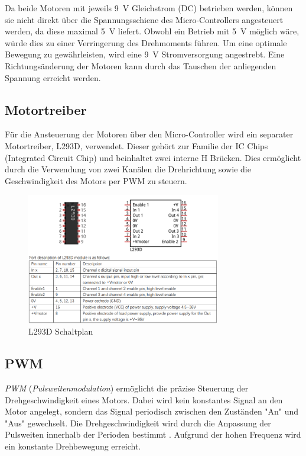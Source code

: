 \documentclass[conference,compsoc,final,a4paper]{IEEEtran}
\begin{document}
\noindent Da beide Motoren mit jeweils \qty{9}{V} Gleichstrom (DC) betrieben werden, können sie nicht direkt über die Spannungsschiene des Micro-Controllers angesteuert werden, 
da diese maximal \qty{5}{V} liefert. Obwohl ein Betrieb mit \qty{5}{V} möglich wäre, würde dies zu einer Verringerung des Drehmoments führen. Um eine optimale Bewegung zu gewährleisten, 
wird eine \qty{9}{V} Stromversorgung angestrebt. Eine Richtungsänderung der Motoren kann durch das Tauschen der anliegenden Spannung erreicht werden.  

\subsection{Motortreiber}

Für die Ansteuerung der Motoren über den Micro-Controller wird ein separater Motortreiber, L293D, verwendet.
Dieser gehört zur Familie der IC Chips (Integrated Circuit Chip) und beinhaltet zwei interne H Brücken. Dies ermöglicht durch die Verwendung von zwei Kanälen die Drehrichtung 
sowie die Geschwindigkeit des Motors per PWM  zu steuern.

\begin{figure}[h]
  \centering
\includegraphics[width=8.5cm]{../images/L293D.png}
\caption{L293D Schaltplan \autocite{freenoveTutorial}}\label{Elektrik:L293D}
\end{figure}

\subsection{PWM}
\emph{PWM} (\emph{Pulsweitenmodulation}) ermöglicht die präzise Steuerung der Drehgeschwindigkeit eines Motors. Dabei wird kein konstantes Signal an den Motor angelegt,
sondern das Signal periodisch zwischen den Zuständen "An" und "Aus" gewechselt. Die Drehgeschwindigkeit wird durch die Anpassung der Pulsweiten innerhalb der Perioden 
bestimmt \autocite{611797}. Aufgrund der hohen Frequenz wird ein konstante Drehbewegung erreicht. 
\\
\end{document}
